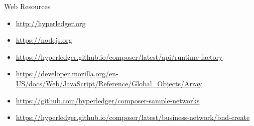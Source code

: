 \documentclass[pdf,table]{beamer}
\begin{document}
\begin{frame}{Web Resources}
	\begin{itemize}
	\item \url{http://hyperledger.org}
	\item \url{https://nodejs.org}
	\item \url{https://hyperledger.github.io/composer/latest/api/runtime-factory}
	\item \url{https://developer.mozilla.org/en-US/docs/Web/JavaScript/Reference/Global_Objects/Array}
	\item \url{https://github.com/hyperledger/composer-sample-networks}
	\item \url{https://hyperledger.github.io/composer/latest/business-network/bnd-create}
	\end{itemize}
\end{frame}
\end{document}
